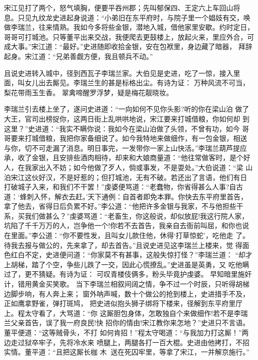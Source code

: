 宋江见打了两个，怒气填胸，便要平吞州郡；先叫郁保四、王定六上车回山将
息。只见九纹龙史进起身说道：“小弟旧在东平府时，与院子里一个娼妓有交，唤
做李瑞兰，往来情熟。我如今多将些金银，潜地入城，借他家里安歇。约时定日，
哥哥可打城池。只等董平出来交战，我便爬去更鼓楼上，放起火来，里应外合，可
成大事。”宋江道：“最好。”史进随即收拾金银，安在包袱里，身边藏了暗器，
拜辞起身。宋江道：“兄弟善觑方便，我且顿兵不动。”

且说史进转入城中，径到西瓦子李瑞兰家。大伯见是史进，吃了一惊，接入里
面，叫女儿出去厮见。李瑞兰生的甚是标格出尘。有诗为证：
万种风流不可当，梨花带雨玉生香。
翠禽啼醒罗浮梦，疑是梅花靓晓妆。

李瑞兰引去楼上坐了，遂问史进道：“一向如何不见你头影?听的你在梁山泊
做了大王，官司出榜捉你，这两日街上乱哄哄地说，宋江要来打城借粮，你如何却
到这里？”史进道：“我实不瞒你说：我如今在梁山泊做了头领，不曾有功，如今
哥哥要来打城借粮，我把你家备细说了。如今我特地来做细作，有一包金银，相送
与你，切不可走漏了消息。明日事完，一发带你一家上山快活。”李瑞兰葫芦提应
承，收了金银，且安排些酒肉相待，却来和大娘商量道：“他往常做客时，是个好
人，在我家出入不妨；如今他做了歹人，倘或事发，不是耍处。”大伯说道：“梁
山泊宋江这伙好汉，不是好惹的；但打城池，无有不破。若还出了言语，他们有日
打破城子入来，和我们不干罢！”虔婆便骂道：“老蠢物，你省得甚么人事?自古
道：‘蜂刺入怀，解衣去赶。’天下通例：自首者即免本罪。你快去东平府里首告，
拿了他去，省得日后负累不好。”李公道：“他把许多金银与我家，不与他担些干
系，买我们做甚么？”虔婆骂道：“老畜生，你这般说，却似放屁!我这行院人家，
坑陷了千千万万的人，岂争他一个!你若不去首告，我亲自去衙前叫屈，和你也说
在里面。”李公道：“你不要性发，且叫女儿款住他，休得‘打草惊蛇’，吃他走
了。待我去报与做公的，先来拿了，却去首告。”且说史进见这李瑞兰上楼来，觉
得面色红白不定，史进便问道：“你家莫不有甚事，这般失惊打怪？”李瑞兰道：
“却才上胡梯，踏了个空，争些儿跌了一交，因此心慌撩乱。”史进虽是英勇，又
吃他瞒过了，更不猜疑。有诗为证：
可叹青楼伎俩多，粉头毕竟护虔婆。
早知暗里施奸计，错用黄金买笑歌。
当下李瑞兰相叙间阔之情，争不过一个时辰，只听得胡梯边脚步响，有人奔上来；
窗外呐声喊，数十个做公的抢到楼上，史进措手不及，正如鹰拿野雀，弹打斑鸠，
把史进似抱头狮子绑将下楼来，径解到东平府里厅上。程太守看了，大骂道：“你
这厮胆包身体，怎敢独自个来做细作!若不是李瑞兰父亲首告，误了我一府良民!快
招你的情由!宋江教你来怎地？”史进只不言语。董平便道：“这等贼骨头，不打
如何肯招！”程太守喝道：“与我加力打这厮！”两边走过狱卒牢子，先将冷水来
喷腿上，两腿各打一百大棍。史进由他拷打，不招实情。董平道：“且把这厮长枷
木，送在死囚牢里，等拿了宋江，一并解京施行。”

